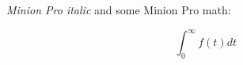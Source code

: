 \documentclass{article}
\begin{document}
{\it Minion Pro italic} and some Minion Pro math:

\[
\int_0^\infty f(t)dt
\]
\end{document}
